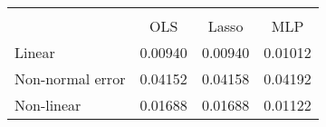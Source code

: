 \begin{tabular}{lccc}
\hline\hline \\ [-1.8ex]
 & OLS & Lasso & MLP \\ 
 \hline 
Linear & 0.00940 & 0.00940 & 0.01012 \\ 
Non-normal error & 0.04152 & 0.04158 & 0.04192 \\ 
Non-linear & 0.01688 & 0.01688 & 0.01122 \\ 
\hline\hline
\end{tabular}